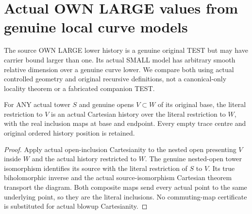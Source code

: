 \section{Actual OWN LARGE values from genuine local curve models}

The source OWN LARGE lower history is a genuine original TEST but may have
carrier bound larger than one. Its actual SMALL model has arbitrary smooth
relative dimension over a genuine curve lower. We compare both using actual
controlled geometry and original recursive definitions, not a canonical-only
locality theorem or a fabricated companion TEST.

\begin{lemma}
\label{hir:original-smaller-open-actual-cartesian}
\leanok
For ANY actual tower $S$ and genuine opens $V\subset W$ of its original base,
the literal restriction to $V$ is an actual Cartesian history over the literal
restriction to $W$, with the real inclusion maps at base and endpoint. Every
empty trace centre and original ordered history position is retained.
\end{lemma}
\begin{proof}
Apply actual open-inclusion Cartesianity to the nested open presenting $V$
inside $W$ and the actual history restricted to $W$. The genuine nested-open
tower isomorphism identifies its source with the literal restriction of $S$
to $V$. Its true biholomorphic inverse and the actual source-isomorphism
Cartesian theorem transport the diagram. Both composite maps send every
actual point to the same underlying point, so they are the literal inclusions.
No commuting-map certificate is substituted for actual blowup Cartesianity.
\end{proof}

